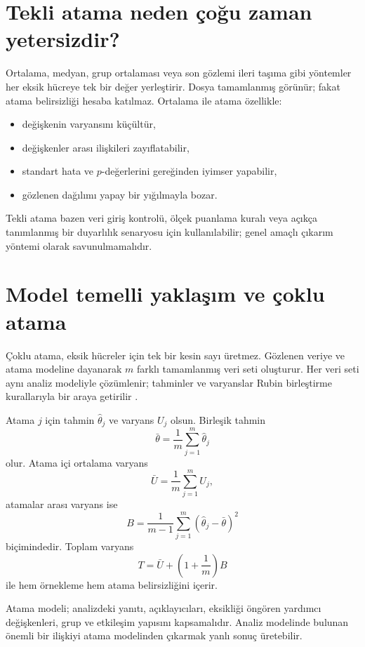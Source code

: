 \section{Tekli atama neden çoğu zaman yetersizdir?}

Ortalama, medyan, grup ortalaması veya son gözlemi ileri taşıma gibi yöntemler
her eksik hücreye tek bir değer yerleştirir. Dosya tamamlanmış görünür; fakat
atama belirsizliği hesaba katılmaz. Ortalama ile atama özellikle:

\begin{itemize}
  \item değişkenin varyansını küçültür,
  \item değişkenler arası ilişkileri zayıflatabilir,
  \item standart hata ve $p$-değerlerini gereğinden iyimser yapabilir,
  \item gözlenen dağılımı yapay bir yığılmayla bozar.
\end{itemize}

Tekli atama bazen veri giriş kontrolü, ölçek puanlama kuralı veya açıkça
tanımlanmış bir duyarlılık senaryosu için kullanılabilir; genel amaçlı çıkarım
yöntemi olarak savunulmamalıdır.

\section{Model temelli yaklaşım ve çoklu atama}

Çoklu atama, eksik hücreler için tek bir kesin sayı üretmez. Gözlenen veriye ve
atama modeline dayanarak $m$ farklı tamamlanmış veri seti oluşturur. Her veri
seti aynı analiz modeliyle çözümlenir; tahminler ve varyanslar Rubin birleştirme
kurallarıyla bir araya getirilir \cite{rubin1976,little2019,vanbuuren2018}.

Atama $j$ için tahmin $\hat\theta_j$ ve varyans $U_j$ olsun. Birleşik tahmin
\[
\bar\theta=\frac{1}{m}\sum_{j=1}^m\hat\theta_j
\]
olur. Atama içi ortalama varyans
\[
\bar U=\frac{1}{m}\sum_{j=1}^m U_j,
\]
atamalar arası varyans ise
\[
B=\frac{1}{m-1}\sum_{j=1}^m(\hat\theta_j-\bar\theta)^2
\]
biçimindedir. Toplam varyans
\[
T=\bar U+\left(1+\frac{1}{m}\right)B
\]
ile hem örnekleme hem atama belirsizliğini içerir.

\begin{assumptionbox}
Atama modeli; analizdeki yanıtı, açıklayıcıları, eksikliği öngören yardımcı
değişkenleri, grup ve etkileşim yapısını kapsamalıdır. Analiz modelinde bulunan
önemli bir ilişkiyi atama modelinden çıkarmak yanlı sonuç üretebilir.
\end{assumptionbox}

